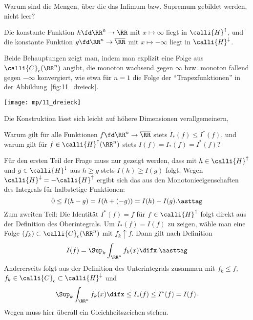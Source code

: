 \begin{frage}
  Warum sind die Mengen, \"uber die das Infimum bzw. Supremum gebildet werden, 
  nicht leer?
\end{frage}

\begin{antwort}
  Die konstante Funktion $h\fd \RR^n \to\overline{\RR}$ mit 
  $x\mapsto \infty$ liegt in 
  $\calli{H}^\uparrow$, und die konstante Funktion 
  $g\fd \RR^n \to\overline{\RR}$ mit $x\mapsto -\infty$ 
  liegt in $\calli{H}^\downarrow$. 

  \parpic[r]{}
  Beide Behauptungen zeigt man, indem man explizit eine Folge aus 
  $\calli{C}_c(\RR^n)$ angibt, die monoton wachsend gegen $\infty$ bzw. 
  monoton fallend gegen $-\infty$ konvergiert, wie etwa für $n=1$ 
  die Folge der "`Trapezfunktionen"' in der Abbildung~\ref{fig:11_dreieck}.

  \begin{center}
    \texttt{[image: mp/11\_dreieck]}
    \label{fig:11_dreieck}
  \end{center}


  Die Konstruktion lässt sich leicht auf 
  höhere Dimensionen verallgemeinern, 
  \AntEnd
\end{antwort} 



\begin{frage}\label{11_lebeab}
  Warum gilt f\"ur alle Funktionen $f\fd \RR^n \to \overline{\RR}$ stets $
  I_*(f) \le I^*(f)$,
  und warum gilt f\"ur $f\in \calli{H}^\uparrow (\RR^n)$ stets $
  I(f)= I_*(f)=I^*(f)$?
\end{frage}

\begin{antwort}
  F\"ur den ersten Teil der Frage muss 
  nur gezeigt werden, dass mit $h \in \calli{H}^\uparrow$ 
  und $g\in \calli{H}^\downarrow$ aus $h\ge g$ stets 
  $I(h) \ge I(g)$ folgt. 
  Wegen $\calli{H}^\downarrow = - \calli{H}^\uparrow$ 
  ergibt sich das aus den Monotonieeigenschaften 
  des Integrals f\"ur halbstetige Funktionen:
  \[
  0 \le I(h-g) = I(h+(-g))=I(h)-I(g). \asttag
  \]
  Zum zweiten Teil: Die Identit\"at $I^* (f)=f$ f\"ur 
  $f\in \calli{H}^\uparrow$ folgt direkt aus der Definition des 
  Oberintegrals. Um $I_*(f)=I(f)$ zu zeigen, w\"ahle man eine Folge 
  $(f_k)\subset \calli{C}_c (\RR^n)$ mit $f_k \uparrow f$. Dann gilt 
  nach Definition 
  \[
  I(f) = \Sup_k \int_{\RR^n} f_k (x) \difx. \aasttag
  \]
  Andererseits folgt aus der Definition des Unterintegrals 
  zusammen mit $f_k \le f$, 
  $f_k \in \calli{C}_c \subset \calli{H}^\downarrow$ 
  und {\astref}
  \[
  \Sup_{k} \int_{\RR^n} f_k (x) \difx \le I_*(f) \le I^*(f) = I(f).
  \]
  Wegen {\astastref} muss hier \"uberall ein Gleichheitszeichen 
  stehen.\AntEnd
\end{antwort} 

